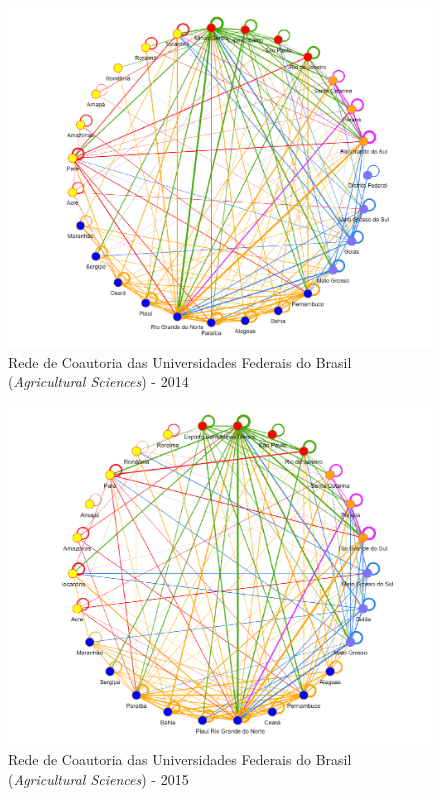 \begin{figure}[H]
	\centering
	\includegraphics[scale=0.6]{Imagens/rede-agr-br-2014.pdf}
	\caption{Rede de Coautoria das Universidades Federais do Brasil (\textit{Agricultural Sciences}) - 2014}
	\label{Rede de Coautoria - UF AGRI BR 2014}
\end{figure}


\begin{figure}[H]
	\centering
	\includegraphics[scale=0.6]{Imagens/rede-agr-br-2015.pdf}
	\caption{Rede de Coautoria das Universidades Federais do Brasil (\textit{Agricultural Sciences}) - 2015}
	\label{Rede de Coautoria - UF AGRI BR 2015}
\end{figure}

